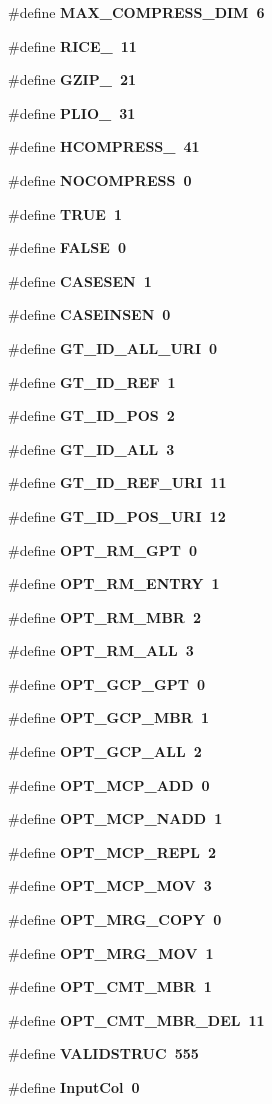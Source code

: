 \begin{CompactItemize}
\#define \bf{MAX\_\-COMPRESS\_\-DIM}~6
\item 
\#define \bf{RICE\_}~11
\item 
\#define \bf{GZIP\_}~21
\item 
\#define \bf{PLIO\_}~31
\item 
\#define \bf{HCOMPRESS\_}~41
\item 
\#define \bf{NOCOMPRESS}~0
\item 
\#define \bf{TRUE}~1
\item 
\#define \bf{FALSE}~0
\item 
\#define \bf{CASESEN}~1
\item 
\#define \bf{CASEINSEN}~0
\item 
\#define \bf{GT\_\-ID\_\-ALL\_\-URI}~0
\item 
\#define \bf{GT\_\-ID\_\-REF}~1
\item 
\#define \bf{GT\_\-ID\_\-POS}~2
\item 
\#define \bf{GT\_\-ID\_\-ALL}~3
\item 
\#define \bf{GT\_\-ID\_\-REF\_\-URI}~11
\item 
\#define \bf{GT\_\-ID\_\-POS\_\-URI}~12
\item 
\#define \bf{OPT\_\-RM\_\-GPT}~0
\item 
\#define \bf{OPT\_\-RM\_\-ENTRY}~1
\item 
\#define \bf{OPT\_\-RM\_\-MBR}~2
\item 
\#define \bf{OPT\_\-RM\_\-ALL}~3
\item 
\#define \bf{OPT\_\-GCP\_\-GPT}~0
\item 
\#define \bf{OPT\_\-GCP\_\-MBR}~1
\item 
\#define \bf{OPT\_\-GCP\_\-ALL}~2
\item 
\#define \bf{OPT\_\-MCP\_\-ADD}~0
\item 
\#define \bf{OPT\_\-MCP\_\-NADD}~1
\item 
\#define \bf{OPT\_\-MCP\_\-REPL}~2
\item 
\#define \bf{OPT\_\-MCP\_\-MOV}~3
\item 
\#define \bf{OPT\_\-MRG\_\-COPY}~0
\item 
\#define \bf{OPT\_\-MRG\_\-MOV}~1
\item 
\#define \bf{OPT\_\-CMT\_\-MBR}~1
\item 
\#define \bf{OPT\_\-CMT\_\-MBR\_\-DEL}~11
\item 
\#define \bf{VALIDSTRUC}~555
\item 
\#define \bf{Input\-Col}~0
\item 

\end{CompactItemize}
